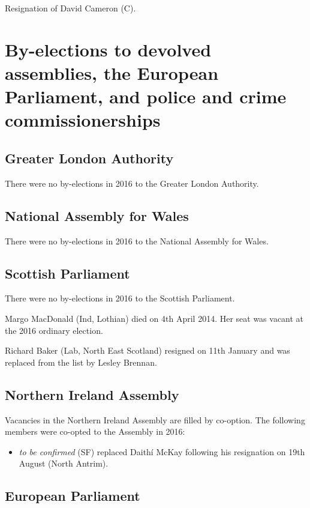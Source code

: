 \documentclass[a4paper,openany]{book}
\begin{document}

Resignation of David Cameron (C).

\chapter{By-elections to devolved assemblies, the European Parliament, and police and crime commissionerships}

\section{Greater London Authority}

There were no by-elections in 2016 to the Greater London Authority.

\section{National Assembly for Wales}

There were no by-elections in 2016 to the National Assembly for Wales.

\section{Scottish Parliament}

There were no by-elections in 2016 to the Scottish Parliament.

Margo MacDonald (Ind, Lothian) died on 4th April 2014.  Her seat was vacant at the 2016 ordinary election.

Richard Baker (Lab, North East Scotland) resigned on 11th January and was replaced from the list by Lesley Brennan.

\section{Northern Ireland Assembly}

Vacancies in the Northern Ireland Assembly are filled by co-option.
%
The following members were co-opted to the Assembly in 2016:
\begin{itemize}
\item \emph{to be confirmed} (SF) replaced Daith\'i McKay following his resignation on 19th August (North Antrim).
\end{itemize}

\section{European Parliament}
\end{document}

